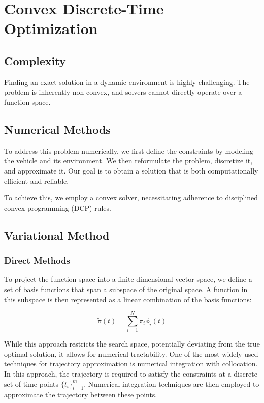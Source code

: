 \section{Convex Discrete-Time Optimization} \label{sec:convex_discrete_time_optimization}

\subsection{Complexity} \label{subsec:complexity}

Finding an exact solution in a dynamic environment is highly challenging.
The problem is inherently non-convex, and solvers cannot directly operate over a function space.

\subsection{Numerical Methods} \label{subsec:numerical_methods}

To address this problem numerically, we first define the constraints by modeling the vehicle and its environment.
We then reformulate the problem, discretize it, and approximate it.
Our goal is to obtain a solution that is both computationally efficient and reliable.

To achieve this, we employ a convex solver, necessitating adherence to disciplined convex programming (DCP) rules.

\subsection{Variational Method} \label{subsec:variational_method}

\subsubsection{Direct Methods}

To project the function space into a finite-dimensional vector space, we define a set of basis functions that span a subspace of the original space.
A function in this subspace is then represented as a linear combination of the basis functions:

\begin{equation}
	\tilde{\pi}(t) = \sum_{i=1}^{N} \pi_i \phi_i(t)
\end{equation}

While this approach restricts the search space, potentially deviating from the true optimal solution, it allows for numerical tractability.
One of the most widely used techniques for trajectory approximation is numerical integration with collocation.
In this approach, the trajectory is required to satisfy the constraints at a discrete set of time points $\{t_i\}_{i=1}^{m}$.
Numerical integration techniques are then employed to approximate the trajectory between these points.

